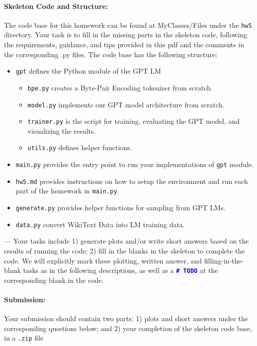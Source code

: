 \noindent \paragraph{Skeleton Code and Structure:}
The code base for this homework can be found at MyClasses/Files under the \texttt{hw5} directory. Your task is to fill in the missing parts in the skeleton code, following the requirements, guidance, and tips provided in this pdf and the comments in the corresponding .py files.
The code base has the following structure:
\begin{itemize}
    \item \texttt{gpt} defines the Python module of the GPT LM
    \begin{itemize}
        \item \texttt{bpe.py} creates a Byte-Pair Encoding tokenizer from scratch.
        \item \texttt{model.py} implements our GPT model architecture from scratch.
        \item \texttt{trainer.py} is the script for training, evaluating the GPT model, and visualizing the results.
        \item \texttt{utils.py} defines helper functions.
    \end{itemize}
    \item \texttt{main.py} provides the entry point to run your implementations of \texttt{gpt} module.
    \item \texttt{hw5.md} provides instructions on how to setup the environment and run each part of the homework in \texttt{main.py}.
    \item \texttt{generate.py} provides helper functions for sampling from GPT LMs.
    \item \texttt{data.py} convert WikiText Data into LM training data.
\end{itemize}

\noindent \todo{} ---
Your tasks include
1) generate plots and/or write short answers based on the results of running the code; 2) fill in the blanks in the skeleton to complete the code. We will explicitly mark these plotting, written answer, and filling-in-the-blank tasks as \todo{} in the following descriptions, as well as a \textcolor{blue}{\texttt{\textbf{\#~TODO}}} at the corresponding blank in the code.

\noindent \paragraph{Submission:} Your submission should contain two parts: 1) plots and short answers under the corresponding questions below; and 2) your completion of the skeleton code base, in a \texttt{.zip} file
